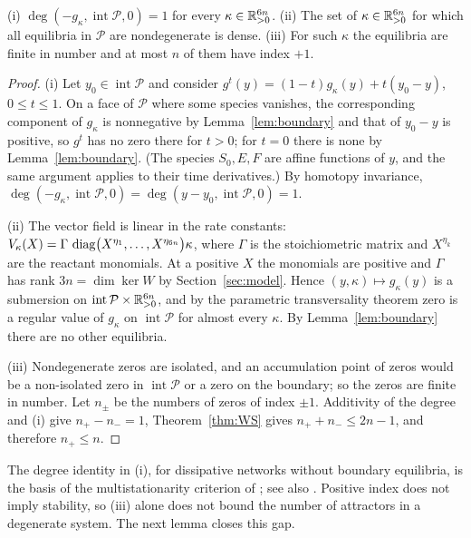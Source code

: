 \begin{lemma}\label{lem:degree}
\textup{(i)} \(\deg(-g_\kappa,\operatorname{int}\mathcal P,0)=1\) for every
\(\kappa\in\mathbb R^{6n}_{>0}\).
\textup{(ii)} The set of \(\kappa\in\mathbb R^{6n}_{>0}\) for which all equilibria in \(\mathcal P\) are
nondegenerate is dense.
\textup{(iii)} For such \(\kappa\) the equilibria are finite in number and at most \(n\) of them
have index \(+1\).
\end{lemma}
\begin{proof}
(i) Let \(y_0\in\operatorname{int}\mathcal P\) and consider
\(g^{t}(y)=(1-t)g_\kappa(y)+t(y_0-y)\), \(0\le t\le1\). On a face of \(\mathcal P\) where some
species vanishes, the corresponding component of \(g_\kappa\) is nonnegative by
Lemma~\ref{lem:boundary} and that of \(y_0-y\) is positive, so \(g^t\) has no zero there for
\(t>0\); for \(t=0\) there is none by Lemma~\ref{lem:boundary}. (The species \(S_0,E,F\) are
affine functions of \(y\), and the same argument applies to their time derivatives.) By
homotopy invariance, \(\deg(-g_\kappa,\operatorname{int}\mathcal P,0)=\deg(y-y_0,\operatorname{int}\mathcal P,0)=1\).

(ii) The vector field is linear in the rate constants:
\(V_\kappa(X)=\Gamma\,\operatorname{diag}\bigl(X^{\eta_1},\dots,X^{\eta_{6n}}\bigr)\kappa\), where \(\Gamma\) is
the stoichiometric matrix and \(X^{\eta_k}\) are the reactant monomials. At a positive \(X\) the
monomials are positive and \(\Gamma\) has rank \(3n=\dim\ker W\) by Section~\ref{sec:model}. Hence
\((y,\kappa)\mapsto g_\kappa(y)\) is a submersion on
\(\operatorname{int}\mathcal P\times\mathbb R^{6n}_{>0}\), and by the parametric transversality theorem
\cite[Ch.~2, \S3]{GuilleminPollack} zero is a regular value of \(g_\kappa\) on
\(\operatorname{int}\mathcal P\) for almost every \(\kappa\). By Lemma~\ref{lem:boundary} there
are no other equilibria.

(iii) Nondegenerate zeros are isolated, and an accumulation point of zeros would be a
non-isolated zero in \(\operatorname{int}\mathcal P\) or a zero on the boundary; so the zeros
are finite in number. Let \(n_\pm\) be the numbers of zeros of index \(\pm1\). Additivity of the
degree and (i) give \(n_+-n_-=1\), Theorem~\ref{thm:WS} gives \(n_++n_-\le2n-1\), and therefore
\(n_+\le n\).
\end{proof}

The degree identity in (i), for dissipative networks without boundary equilibria, is the basis
of the multistationarity criterion of \cite{CFMW2017}; see also \cite{Hofbauer1990}. Positive
index does not imply stability, so (iii) alone does not bound the number of attractors in a
degenerate system. The next lemma closes this gap.

